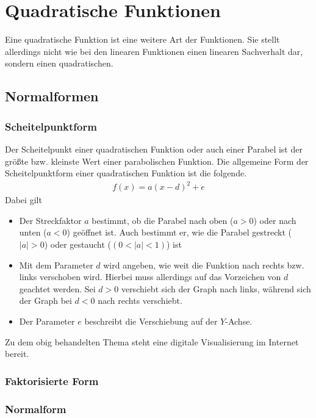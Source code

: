\section{Quadratische Funktionen}\label{sec:Quadratische Funktionen}
Eine quadratische Funktion ist eine weitere Art der Funktionen. Sie stellt allerdings nicht wie bei den linearen Funktionen einen linearen Sachverhalt dar, sondern einen quadratischen. 
\subsection{Normalformen}\label{sec:Quadratische Funktionen/Normalform}
\subsubsection{Scheitelpunktform}
Der Scheitelpunkt einer quadratischen Funktion oder auch einer Parabel ist der größte bzw. kleinste Wert einer parabolischen Funktion. Die allgemeine Form der Scheitelpunktform einer quadratischen Funktion ist die folgende. 
\begin{align*}
	f(x)=a(x-d)^2+e
\end{align*}
Dabei gilt
\begin{itemize}
	\item Der Streckfaktor $a$ bestimmt, ob die Parabel nach oben ($a>0$) oder nach unten ($a<0$) geöffnet ist. Auch bestimmt er, wie die Parabel gestreckt ($|a|>0$) oder gestaucht ($(0<|a|<1)$) ist
	\item Mit dem Parameter $d$ wird angeben, wie weit die Funktion nach rechts bzw. links verschoben wird. Hierbei muss allerdings auf das Vorzeichen von $d$ geachtet werden. Sei $d>0$ verschiebt sich der Graph nach links, während sich der Graph bei $d<0$ nach rechts verschiebt.
	\item Der Parameter $e$ beschreibt die Verschiebung auf der $Y$-Achse. 
\end{itemize}
Zu dem obig behandelten Thema steht eine digitale Visualisierung im Internet bereit. \href{https://www.geogebra.org/m/wfekxgxw}{\ExternalLink}

\subsubsection{Faktorisierte Form}\label{sec:Quadratische Funktionen/Faktorisierte Form}
\subsubsection{Normalform} \label{sec:Quadratische Funktionen/Normalform}

